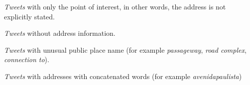 \documentclass[runningheads]{llncs}
\begin{document}
\begin{enumerate*}
\item \textit{Tweets} with only the point of interest, in other words, the address is not explicitly stated.
\item \textit{Tweets} without address information.
\item \textit{Tweets} with unusual public place name (for example \emph{passageway}, \emph{road complex}, \emph{connection to}).
\item \textit{Tweets} with addresses with concatenated words (for example \emph{avenidapaulista})
\end{enumerate*}


\end{document}
